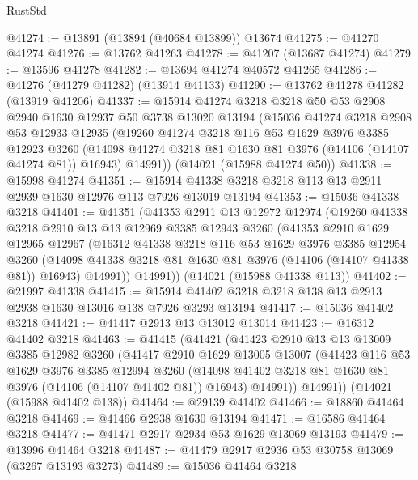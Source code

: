 \begin{lexlean}{RustStd}
\begin{coremodule}
@41274 := @13891 (@13894 (@40684 @13899)) @13674
@41275 := @41270 @41274
@41276 := @13762 @41263
@41278 := @41207 (@13687 @41274)
@41279 := @13596 @41278
@41282 := @13694 @41274 @40572 @41265
@41286 := @41276 (@41279 @41282) (@13914 @41133)
@41290 := @13762 @41278 @41282 (@13919 @41206)
@41337 := @15914
    @41274
    @3218
    @3218
    @50
    @53
    @2908
    @2940
    @1630
    @12937
    @50
    @3738
    @13020
    @13194
    (@15036
      @41274
      @3218
      @2908
      @53
      @12933
      @12935
      (@19260
        @41274
        @3218
        @116
        @53
        @1629
        @3976
        @3385
        @12923
        @3260
        (@14098 @41274 @3218 @81 @1630 @81 @3976 (@14106 (@14107 @41274 @81)) @16943)
        @14991))
    (@14021 (@15988 @41274 @50))
@41338 := @15998 @41274
@41351 := @15914 @41338 @3218 @3218 @113 @13 @2911 @2939 @1630 @12976 @113 @7926 @13019 @13194
@41353 := @15036 @41338 @3218
@41401 := @41351
    (@41353
      @2911
      @13
      @12972
      @12974
      (@19260
        @41338
        @3218
        @2910
        @13
        @13
        @12969
        @3385
        @12943
        @3260
        (@41353
          @2910
          @1629
          @12965
          @12967
          (@16312
            @41338
            @3218
            @116
            @53
            @1629
            @3976
            @3385
            @12954
            @3260
            (@14098 @41338 @3218 @81 @1630 @81 @3976 (@14106 (@14107 @41338 @81)) @16943)
            @14991))
        @14991))
    (@14021 (@15988 @41338 @113))
@41402 := @21997 @41338
@41415 := @15914 @41402 @3218 @3218 @138 @13 @2913 @2938 @1630 @13016 @138 @7926 @3293 @13194
@41417 := @15036 @41402 @3218
@41421 := @41417 @2913 @13 @13012 @13014
@41423 := @16312 @41402 @3218
@41463 := @41415
    (@41421
      (@41423
        @2910
        @13
        @13
        @13009
        @3385
        @12982
        @3260
        (@41417
          @2910
          @1629
          @13005
          @13007
          (@41423
            @116
            @53
            @1629
            @3976
            @3385
            @12994
            @3260
            (@14098 @41402 @3218 @81 @1630 @81 @3976 (@14106 (@14107 @41402 @81)) @16943)
            @14991))
        @14991))
    (@14021 (@15988 @41402 @138))
@41464 := @29139 @41402
@41466 := @18860 @41464 @3218
@41469 := @41466 @2938 @1630 @13194
@41471 := @16586 @41464 @3218
@41477 := @41471 @2917 @2934 @53 @1629 @13069 @13193
@41479 := @13996 @41464 @3218
@41487 := @41479 @2917 @2936 @53 @30758 @13069 (@3267 @13193 @3273)
@41489 := @15036 @41464 @3218

\end{coremodule}
\end{lexlean}
